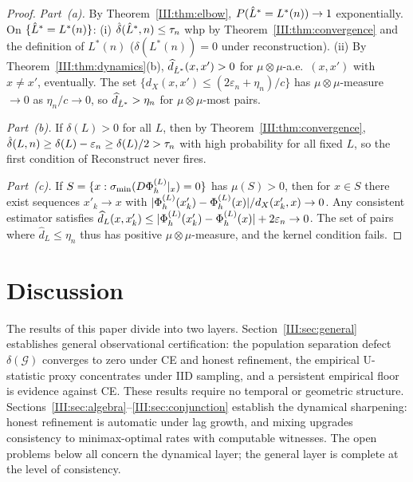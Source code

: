 \begin{proof}
\emph{Part~(a).}
By Theorem~\ref{III:thm:elbow}, $P(\hat{L}^* = L^*(n)) \to 1$ exponentially.
On $\{\hat{L}^* = L^*(n)\}$:
(i) $\hat{\delta}(\hat{L}^*,n) \leq \tau_n$ whp by Theorem~\ref{III:thm:convergence}
and the definition of $L^*(n)$ ($\delta(L^*(n)) = 0$ under reconstruction).
(ii) By Theorem~\ref{III:thm:dynamics}(b), $\widehat{d}_{\hat{L}^*}(x,x') > 0$
for $\mu \otimes \mu$-a.e.\ $(x,x')$ with $x \neq x'$, eventually.
The set $\{d_X(x,x') \leq (2\varepsilon_n + \eta_n)/c\}$ has
$\mu \otimes \mu$-measure $\to 0$ as $\eta_n/c \to 0$, so
$\widehat{d}_{\hat{L}^*} > \eta_n$ for $\mu\otimes\mu$-most pairs.

\emph{Part~(b).}
If $\delta(L) > 0$ for all $L$, then by Theorem~\ref{III:thm:convergence},
$\hat{\delta}(L,n) \geq \delta(L) - \varepsilon_n \geq \delta(L)/2 > \tau_n$
with high probability for all fixed $L$, so the first condition of
$\mathrm{Reconstruct}$ never fires.

\emph{Part~(c).}
If $S = \{x : \sigma_{\min}(D\Phi_h^{(L)}|_x) = 0\}$ has $\mu(S) > 0$,
then for $x \in S$ there exist sequences $x'_k \to x$ with
$|\Phi_h^{(L)}(x'_k) - \Phi_h^{(L)}(x)| / d_X(x'_k, x) \to 0$.
Any consistent estimator satisfies
$\widehat{d}_L(x, x'_k) \leq |\Phi_h^{(L)}(x'_k) - \Phi_h^{(L)}(x)| + 2\varepsilon_n \to 0$.
The set of pairs where $\widehat{d}_L \leq \eta_n$ thus has positive
$\mu \otimes \mu$-measure, and the kernel condition fails.
\end{proof}

\section{Discussion}
\label{III:sec:discussion}

The results of this paper divide into two layers.  Section~\ref{III:sec:general}
establishes general observational certification: the population separation defect
$\delta(\mathcal{G})$ converges to zero under CE and honest refinement, the
empirical U-statistic proxy concentrates under IID sampling, and a persistent
empirical floor is evidence against CE.  These results require no temporal or
geometric structure.  Sections~\ref{III:sec:algebra}--\ref{III:sec:conjunction}
establish the dynamical sharpening: honest refinement is automatic under lag
growth, and mixing upgrades consistency to minimax-optimal rates with computable
witnesses.  The open problems below all concern the dynamical layer; the general
layer is complete at the level of consistency.


